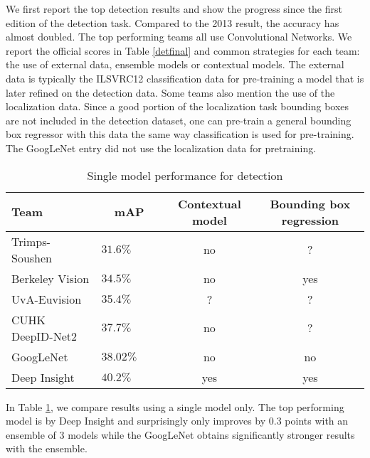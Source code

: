 We first report the top detection results and show the progress since the first edition of the detection task. Compared to the 2013 result, the accuracy has almost doubled. The top performing teams all use Convolutional Networks. 
We report the official scores in Table \ref{detfinal} and common strategies for each team: the use of external data, ensemble models or contextual models. The external data is typically the ILSVRC12 classification data for pre-training a model that is later refined on the detection data. Some teams also mention the use of the localization data. Since a good portion of the localization task bounding boxes are not included in the detection dataset, one can pre-train a general bounding box regressor with this data the same way classification is used for pre-training. The GoogLeNet entry did not use the localization data for pretraining.

\begin{table}
\centering
\begin{tabular}[H]{|l||l|c|c|}
\hline
{\bf Team} & {\bf\ \ mAP\ \ } & {\bf Contextual model} & {\bf Bounding box regression} \\
\hline
Trimps-Soushen & $31.6\%$ & no & ? \\
\hline
Berkeley Vision &  $34.5\%$ & no & yes \\
\hline
UvA-Euvision &  $35.4\%$ & ? & ? \\
\hline
CUHK DeepID-Net2 & $37.7\%$ & no & ? \\
\hline
GoogLeNet & $38.02\%$ & no & no \\
\hline
Deep Insight & $40.2\%$ & yes & yes \\
\hline
\end{tabular}
\caption{Single model performance for detection}
\label{detsinglemodel}
\end{table}

In Table \ref{detsinglemodel}, we compare results using a single model only. The top performing model is by Deep Insight and surprisingly only improves by 0.3 points with an ensemble of 3 models while the GoogLeNet obtains significantly stronger results with the ensemble.
